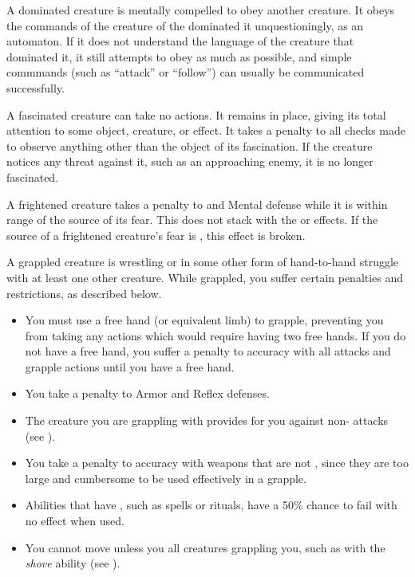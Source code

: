  A dominated creature is mentally compelled to obey another creature.
It obeys the commands of the creature of the dominated it unquestioningly, as an automaton.
If it does not understand the language of the creature that dominated it, it still attempts to obey as much as possible, and simple commmands (such as ``attack'' or ``follow'') can usually be communicated successfully.

 A fascinated creature can take no actions. It remains in place, giving its total attention to some object, creature, or effect. It takes a  penalty to all checks made to observe anything other than the object of its fascination.
If the creature notices any threat against it, such as an approaching enemy, it is no longer fascinated.

 A frightened creature takes a  penalty to  and Mental defense while it is within \rngmed range of the source of its fear.
This does not stack with the  or  effects.
If the source of a frightened creature's fear is , this effect is broken.

 A grappled creature is wrestling or in some other form of hand-to-hand struggle with at least one other creature.
While grappled, you suffer certain penalties and restrictions, as described below.
\begin{itemize}
    \item You must use a free hand (or equivalent limb) to grapple, preventing you from taking any actions which would require having two free hands.
        If you do not have a free hand, you suffer a  penalty to accuracy with all  attacks and grapple actions until you have a free hand.
    \item You take a  penalty to Armor and Reflex defenses.
    \item The creature you are grappling with provides  for you against non- attacks (see ).
    \item You take a  penalty to accuracy with weapons that are not , since they are too large and cumbersome to be used effectively in a grapple.
    \item Abilities that have , such as spells or rituals, have a 50\% chance to fail with no effect when used.
    \item You cannot move unless you  all creatures grappling you, such as with the \textit{shove} ability (see ).
\end{itemize}

